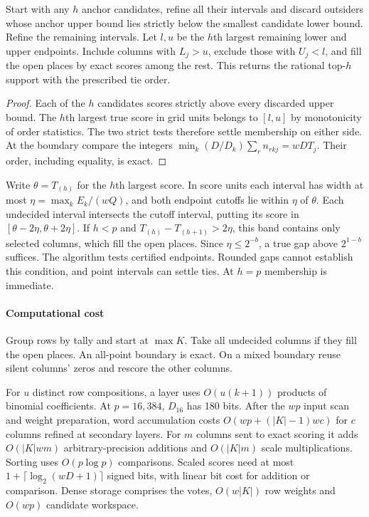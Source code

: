 \begin{proposition}\label{prop:rational}
Start with any $h$ anchor candidates, refine all their intervals and discard outsiders whose anchor upper bound lies strictly below the smallest candidate lower bound. Refine the remaining intervals. Let $l,u$ be the $h$th largest remaining lower and upper endpoints. Include columns with $L_j>u$, exclude those with $U_j<l$, and fill the open places by exact scores among the rest. This returns the rational top-$h$ support with the prescribed tie order.
\end{proposition}
\begin{proof}
Each of the $h$ candidates scores strictly above every discarded upper bound. The $h$th largest true score in grid units belongs to $[l,u]$ by monotonicity of order statistics. The two strict tests therefore settle membership on either side. At the boundary compare the integers $\min_k (D/D_k)\sum_r n_{rkj}=wD T_j$. Their order, including equality, is exact.
\end{proof}
Write $\theta=T_{(h)}$ for the $h$th largest score. In score units each interval has width at most $\eta=\max_k E_k/(wQ)$, and both endpoint cutoffs lie within $\eta$ of $\theta$. Each undecided interval intersects the cutoff interval, putting its score in $[\theta-2\eta,\theta+2\eta]$. If $h<p$ and $T_{(h)}-T_{(h+1)}>2\eta$, this band contains only selected columns, which fill the open places. Since $\eta\le2^{-b}$, a true gap above $2^{1-b}$ suffices. The algorithm tests certified endpoints. Rounded gaps cannot establish this condition, and point intervals can settle ties. At $h=p$ membership is immediate.

\paragraph{Computational cost}
Group rows by tally and start at $\max K$. Take all undecided columns if they fill the open places. An all-point boundary is exact. On a mixed boundary reuse silent columns' zeros and rescore the other columns.

For $u$ distinct row compositions, a layer uses $O(u(k+1))$ products of binomial coefficients. At $p=16{,}384$, $D_{16}$ has 180 bits. After the $wp$ input scan and weight preparation, word accumulation costs $O(wp+(|K|-1)wc)$ for $c$ columns refined at secondary layers. For $m$ columns sent to exact scoring it adds $O(|K|wm)$ arbitrary-precision additions and $O(|K|m)$ scale multiplications. Sorting uses $O(p\log p)$ comparisons. Scaled scores need at most $1+\lceil\log_2(wD+1)\rceil$ signed bits, with linear bit cost for addition or comparison. Dense storage comprises the votes, $O(w|K|)$ row weights and $O(wp)$ candidate workspace.

